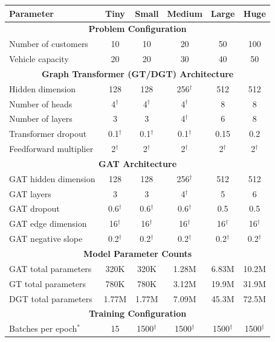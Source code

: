 \documentclass[a4paper,twoside]{article}
\begin{document}
\begin{table}[htbp]
\centering
\begin{tabular}{@{}l|ccccc@{}}
\toprule
\textbf{Parameter} & \textbf{Tiny} & \textbf{Small} & \textbf{Medium} & \textbf{Large} & \textbf{Huge} \\
\midrule
\multicolumn{6}{c}{\textbf{Problem Configuration}} \\
\midrule
Number of customers & 10 & 10 & 20 & 50 & 100 \\
Vehicle capacity & 20 & 20 & 30 & 40 & 50 \\
\midrule
\multicolumn{6}{c}{\textbf{Graph Transformer (GT/DGT) Architecture}} \\
\midrule
Hidden dimension & 128 & 128 & 256$^{\dagger}$ & 512 & 512 \\
Number of heads & 4$^{\dagger}$ & 4$^{\dagger}$ & 4$^{\dagger}$ & 8 & 8 \\
Number of layers & 3 & 3 & 4$^{\dagger}$ & 6 & 8 \\
Transformer dropout & 0.1$^{\dagger}$ & 0.1$^{\dagger}$ & 0.1$^{\dagger}$ & 0.15 & 0.2 \\
Feedforward multiplier & 2$^{\dagger}$ & 2$^{\dagger}$ & 2$^{\dagger}$ & 2$^{\dagger}$ & 2$^{\dagger}$ \\
\midrule
\multicolumn{6}{c}{\textbf{GAT Architecture}} \\
\midrule
GAT hidden dimension & 128 & 128 & 256$^{\dagger}$ & 512 & 512 \\
GAT layers & 3 & 3 & 4$^{\dagger}$ & 5 & 6 \\
GAT dropout & 0.6$^{\dagger}$ & 0.6$^{\dagger}$ & 0.6$^{\dagger}$ & 0.5 & 0.5 \\
GAT edge dimension & 16$^{\dagger}$ & 16$^{\dagger}$ & 16$^{\dagger}$ & 16$^{\dagger}$ & 16$^{\dagger}$ \\
GAT negative slope & 0.2$^{\dagger}$ & 0.2$^{\dagger}$ & 0.2$^{\dagger}$ & 0.2$^{\dagger}$ & 0.2$^{\dagger}$ \\
\midrule
\multicolumn{6}{c}{\textbf{Model Parameter Counts}} \\
\midrule
GAT total parameters & 320K & 320K & 1.28M & 6.83M & 10.2M \\
GT total parameters & 780K & 780K & 3.12M & 19.9M & 31.9M \\
DGT total parameters & 1.77M & 1.77M & 7.09M & 45.3M & 72.5M \\
\midrule
\multicolumn{6}{c}{\textbf{Training Configuration}} \\
\midrule
Batches per epoch$^{*}$ & 15 & 1500$^{\dagger}$ & 1500$^{\dagger}$ & 1500$^{\dagger}$ & 1500$^{\dagger}$ \\

\end{tabular}
\end{table}
\end{document}

